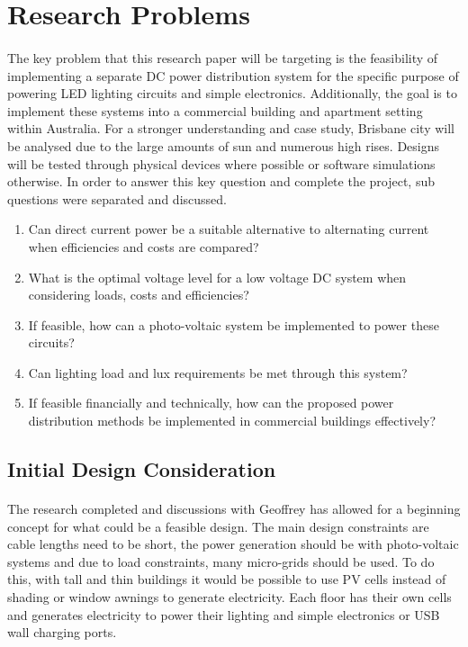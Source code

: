 
\section{Research Problems}

\paragraph{}
The key problem that this research paper will be targeting is the feasibility of implementing a separate DC power distribution system for the specific purpose of powering LED lighting circuits and simple electronics. Additionally, the goal is to implement these systems into a commercial building and apartment setting within Australia. For a stronger understanding and case study, Brisbane city will be analysed due to the large amounts of sun and numerous high rises. Designs will be tested through physical devices where possible or software simulations otherwise. In order to answer this key question and complete the project, sub questions were separated and discussed.

\begin{enumerate}
\itemsep-0.5em 
\item Can direct current power be a suitable alternative to alternating current when efficiencies and costs are compared?
\item What is the optimal voltage level for a low voltage DC system when considering loads, costs and efficiencies?
\item If feasible, how can a photo-voltaic system be implemented to power these circuits?
\item Can lighting load and lux requirements be met through this system?
\item If feasible financially and technically, how can the proposed power distribution methods be implemented in commercial buildings effectively?
\end{enumerate} 

\subsection{Initial Design Consideration}

\paragraph{}
The research completed and discussions with Geoffrey has allowed for a beginning concept for what could be a feasible design. The main design constraints are cable lengths need to be short, the power generation should be with photo-voltaic systems and due to load constraints, many micro-grids should be used. To do this, with tall and thin buildings it would be possible to use PV cells instead of shading or window awnings to generate electricity. Each floor has their own cells and generates electricity to power their lighting and simple electronics or USB wall charging ports. 

